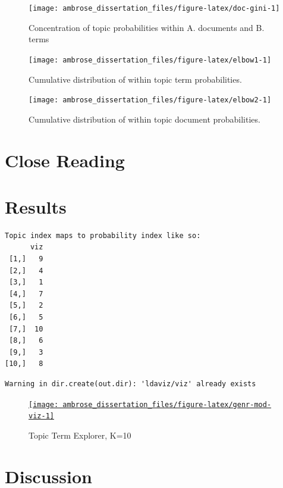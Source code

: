 \documentclass[]{book}
\theoremstyle{definition}
\theoremstyle{definition}
\theoremstyle{definition}
\theoremstyle{remark}
\begin{document}
\begin{figure}

{\centering \texttt{[image: ambrose\_dissertation\_files/figure-latex/doc-gini-1]} 

}

\caption{Concentration of topic probabilities within A. documents and B. terms}\label{fig:doc-gini}
\end{figure}

\begin{figure}

{\centering \texttt{[image: ambrose\_dissertation\_files/figure-latex/elbow1-1]} 

}

\caption{Cumulative distribution of within topic term probabilities.}\label{fig:elbow1}
\end{figure}

\begin{figure}

{\centering \texttt{[image: ambrose\_dissertation\_files/figure-latex/elbow2-1]} 

}

\caption{Cumulative distribution of within topic document probabilities.}\label{fig:elbow2}
\end{figure}

\hypertarget{close-reading}{%
\section{Close Reading}\label{close-reading}}

\hypertarget{results}{%
\section{Results}\label{results}}

\begin{verbatim}
Topic index maps to probability index like so:
      viz
 [1,]   9
 [2,]   4
 [3,]   1
 [4,]   7
 [5,]   2
 [6,]   5
 [7,]  10
 [8,]   6
 [9,]   3
[10,]   8
\end{verbatim}

\begin{verbatim}
Warning in dir.create(out.dir): 'ldaviz/viz' already exists
\end{verbatim}

\begin{figure}

{\centering \href{https://mercury.dlab.berkeley.edu:2018}{\texttt{[image: ambrose\_dissertation\_files/figure-latex/genr-mod-viz-1]} }

}

\caption{Topic Term Explorer, K=10}\label{fig:genr-mod-viz}
\end{figure}

\hypertarget{discussion}{%
\section{Discussion}\label{discussion}}


\end{document}

